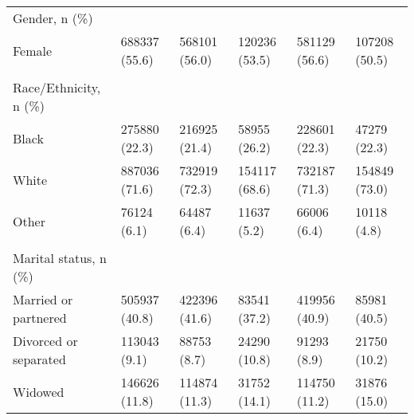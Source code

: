 \begin{adjustbox}{width={\textwidth},totalheight={\textheight},keepaspectratio,frame}
{\begin{tabular}{L{20em}C{10em}C{10em}C{10em}C{10em}C{10em}}
Gender, n (\%) &                 &                            &                        &                             &                        \\
\hspace{3mm} Female &      688337 (55.6) &                 568101 (56.0) &             120236 (53.5) &                  581129 (56.6) &             107208 (50.5) \\
&                 &                            &                        &                             &                        \\
Race/Ethnicity, n (\%) &                 &                            &                        &                             &                        \\
\hspace{3mm}               Black &      275880 (22.3) &                 216925 (21.4) &              58955 (26.2) &                  228601 (22.3) &              47279 (22.3) \\
\hspace{3mm}               White &      887036 (71.6) &                 732919 (72.3) &             154117 (68.6) &                  732187 (71.3) &             154849 (73.0) \\
\hspace{3mm}               Other &        76124 (6.1) &                   64487 (6.4) &               11637 (5.2) &                    66006 (6.4) &               10118 (4.8) \\
&                 &                            &                        &                             &                        \\
Marital status, n (\%) &                 &                            &                        &                             &                        \\
\hspace{3mm}      Married or partnered &      505937 (40.8) &                 422396 (41.6) &              83541 (37.2) &                  419956 (40.9) &              85981 (40.5) \\
\hspace{3mm}     Divorced or separated &       113043 (9.1) &                   88753 (8.7) &              24290 (10.8) &                    91293 (8.9) &              21750 (10.2) \\
\hspace{3mm}                   Widowed &      146626 (11.8) &                 114874 (11.3) &              31752 (14.1) &                  114750 (11.2) &              31876 (15.0) \\

\end{tabular}}
\end{adjustbox}
